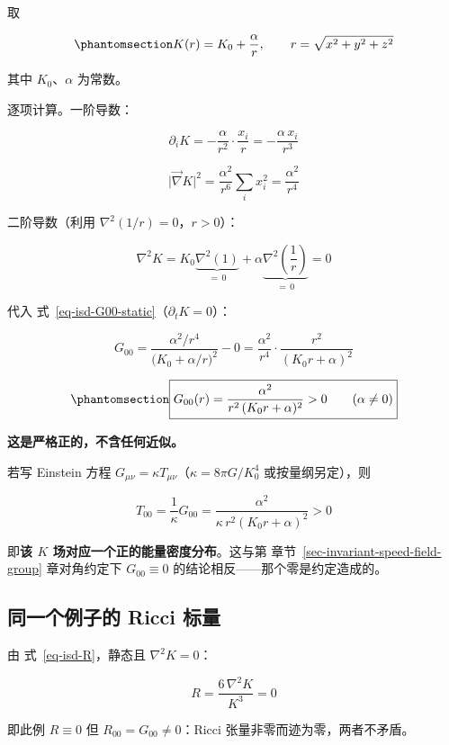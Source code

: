 \documentclass[
  chinese,
  a4paper,
  UTF8,
  12pt,
  oneside,
  openany]{ctexbook}
\theoremstyle{plain}
\theoremstyle{plain}
\theoremstyle{plain}
\theoremstyle{definition}
\theoremstyle{plain}
\theoremstyle{plain}
\theoremstyle{remark}
\begin{document}
取

\begin{equation}\protect\phantomsection\label{eq-isd-example}{
K(r)=K_0+\frac{\alpha}{r},\qquad r=\sqrt{x^{2}+y^{2}+z^{2}}
}\end{equation}

其中 \(K_0\)、\(\alpha\) 为常数。

逐项计算。一阶导数：

\[
\partial_iK=-\frac{\alpha}{r^{2}}\cdot\frac{x_i}{r}=-\frac{\alpha\,x_i}{r^{3}}
\]

\[
\lvert\vec\nabla K\rvert^{2}=\frac{\alpha^{2}}{r^{6}}\sum_i x_i^{2}=\frac{\alpha^{2}}{r^{4}}
\]

二阶导数（利用 \(\nabla^{2}(1/r)=0\)，\(r>0\)）：

\[
\nabla^{2}K=K_0\underbrace{\nabla^{2}(1)}_{=\,0}+\alpha\underbrace{\nabla^{2}\!\left(\frac{1}{r}\right)}_{=\,0}=0
\]

代入 式~\ref{eq-isd-G00-static}（\(\partial_tK=0\)）：

\[
G_{00}=\frac{\alpha^{2}/r^{4}}{\bigl(K_0+\alpha/r\bigr)^{2}}-0
=\frac{\alpha^{2}}{r^{4}}\cdot\frac{r^{2}}{(K_0r+\alpha)^{2}}
\]

\begin{equation}\protect\phantomsection\label{eq-isd-density}{
\boxed{G_{00}(r)=\frac{\alpha^{2}}{r^{2}\,(K_0r+\alpha)^{2}}>0\qquad(\alpha\neq0)}
}\end{equation}

\textbf{这是严格正的，不含任何近似。}

若写 Einstein 方程
\(G_{\mu\nu}=\kappa T_{\mu\nu}\)（\(\kappa=8\pi G/K_0^{4}\)
或按量纲另定），则

\[
T_{00}=\frac{1}{\kappa}G_{00}=\frac{\alpha^{2}}{\kappa\,r^{2}(K_0r+\alpha)^{2}}>0
\]

即\textbf{该 \(K\) 场对应一个正的能量密度分布}。这与第
章节~\ref{sec-invariant-speed-field-group} 章对角约定下
\(G_{00}\equiv0\) 的结论相反------那个零是约定造成的。

\subsection{同一个例子的 Ricci
标量}\label{ux540cux4e00ux4e2aux4f8bux5b50ux7684-ricci-ux6807ux91cf}

由 式~\ref{eq-isd-R}，静态且 \(\nabla^{2}K=0\)：

\[
R=\frac{6\,\nabla^{2}K}{K^{3}}=0
\]

即此例 \(R\equiv0\) 但 \(R_{00}=G_{00}\neq0\)：Ricci
张量非零而迹为零，两者不矛盾。
\end{document}
